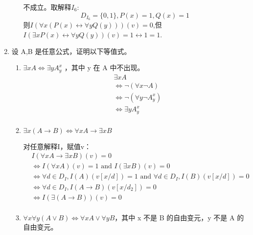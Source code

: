 \documentclass[UTF8]{ctexart}
\begin{document}
\begin{enumerate}
\begin{enumerate}
            不成立。取解释$I_6$:
            \[
                D_{I_6}=\{0,1\},P(x)=1,Q(x)=1
            \]
            则$I(\forall x(P(x)\leftrightarrow \forall yQ(y)))(v)=0$,但$I(\exists xP(x)\leftrightarrow \forall yQ(y))(v)=1\leftrightarrow1=1$.
        
        
        \end{enumerate}
        
        \item 设 A,B 是任意公式，证明以下等值式。
        \begin{enumerate}
            \item $\exists xA\Leftrightarrow \exists yA^x_y$ ，其中 y 在 A 中不出现。
            \[
                \begin{aligned}
                    &\exists xA\\
                    &\Leftrightarrow \neg(\forall x\neg A)\\
                    &\Leftrightarrow \neg(\forall y\neg A_y^x)\\
                    &\Leftrightarrow \exists yA_y^x\\
                \end{aligned}
            \]
            \item $\exists x(A\rightarrow B)\Leftrightarrow \forall xA\rightarrow \exists xB$
            
            对任意解释I，赋值v：
            \[
                \begin{aligned}
                    &I(\forall xA\rightarrow \exists xB)(v)=0\\
                    &\Leftrightarrow I(\forall xA)(v)=1 \text{ and } I(\exists xB)(v)=0\\
                    &\Leftrightarrow \forall d\in D_I,I(A)(v[x/d])=1 \text{ and } \forall d\in D_I,I(B)(v[x/d])=0\\
                    &\Leftrightarrow \forall d\in D_I,I(A\rightarrow B)(v[x/d_2])=0\\
                    &\Leftrightarrow I(\exists (A\rightarrow B))(v)=0\\
                \end{aligned}    
            \]
            \item $\forall x\forall y(A\vee B)\Leftrightarrow \forall xA\vee \forall yB$，其中 x 不是 B 的自由变元，y 不是 A 的自由变元。
            

\end{enumerate}
\end{enumerate}
\end{document}
